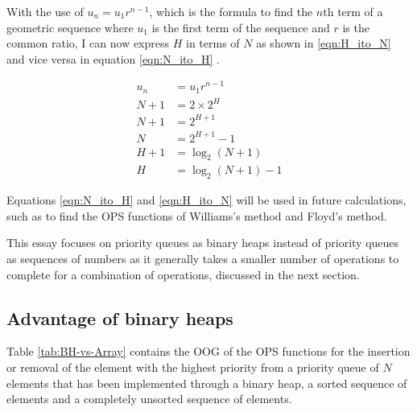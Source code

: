 \documentclass[12pt]{article}
\begin{document}
With the use of $u_n=u_1r^{n-1}$, which is the formula to find the $n$th term of a geometric sequence where $u_1$ is the first term of the sequence and $r$ is the common ratio, I can now express $H$ in terms of $N$ as shown in \eqref{eqn:H_ito_N} and vice versa in equation \ref{eqn:N_ito_H} \parencite{ib}.
\vspace{-2em}

\bgroup
\allowdisplaybreaks
\onehalfspacing
\begin{align}
    u_n&=u_1r^{n-1} \nonumber\\
    N+1&=2\times2^H \nonumber\\
    N+1&=2^{H+1} \nonumber \\
    N&=2^{H+1}-1 \label{eqn:N_ito_H}\\
    H+1&=\log_2(N+1) \nonumber \\
    H&=\log_2(N+1)-1 \label{eqn:H_ito_N}
\end{align}
\egroup

Equations \ref{eqn:N_ito_H} and \ref{eqn:H_ito_N} will be used in future calculations, such as to find the OPS functions of Williams's method and Floyd's method.\newline

This essay focuses on priority queues as binary heaps instead of priority queues as sequences of numbers as it generally takes a smaller number of operations to complete for a combination of operations, discussed in the next section.

\subsection{Advantage of binary heaps}\label{advantage_of_binary_heaps}
Table \ref{tab:BH-vs-Array} contains the OOG of the OPS functions for the insertion or removal of the element with the highest priority from a priority queue of $N$ elements that has been implemented through a binary heap, a sorted sequence of elements and a completely unsorted sequence of elements.\vspace{1em}
\end{document}
